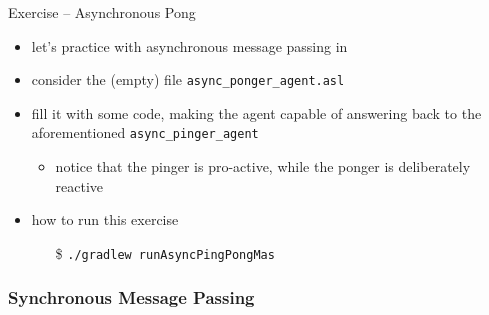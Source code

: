 \documentclass[presentation]{beamer}\mode<presentation>{\usetheme{AMSBolognaFC}}
\begin{document}
\startExercise
\begin{frame}[c, allowframebreaks]{Exercise \currentExercise{} -- Asynchronous Pong}
\begin{itemize}
    \item let's practice with asynchronous message passing in \jason{}
    
    \vspace{.3cm}
    
    \item consider the (empty) file \texttt{async\_ponger\_agent.asl}
    
    \vspace{.3cm}
    
    \item fill it with some \jason{} code, making the agent capable of answering back to the aforementioned \texttt{async\_pinger\_agent}
    \begin{itemize}
        \item notice that the pinger is pro-active, while the ponger is deliberately reactive 
    \end{itemize}
    
    \vspace{.3cm}
    
    \item how to run this exercise
    \begin{itemize}
        \item[\$] \texttt{./gradlew run\alert{AsyncPingPong}Mas}
    \end{itemize}
    
\end{itemize}
\end{frame}

\subsubsection{Synchronous Message Passing}
\end{document}
